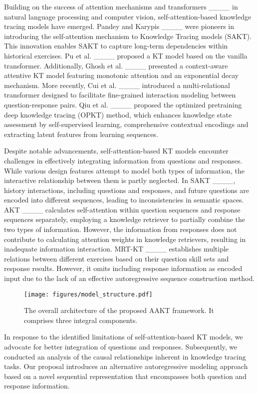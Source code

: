 Building on the success of attention mechanisms and transformers ____ in natural language processing and computer vision, self-attention-based knowledge tracing models have emerged. Pandey and Karypis ____ were pioneers in introducing the self-attention mechanism to Knowledge Tracing models (SAKT). This innovation enables SAKT to capture long-term dependencies within historical exercises. Pu et al. ____ proposed a KT model based on the vanilla transformer. Additionally, Ghosh et al. ____ presented a context-aware attentive KT model featuring monotonic attention and an exponential decay mechanism. More recently, Cui et al. ____ introduced a multi-relational transformer designed to facilitate fine-grained interaction modeling between question-response pairs. Qiu et al. ____ proposed the optimized pretraining deep knowledge tracing (OPKT) method, which enhances knowledge state assessment by self-supervised learning, comprehensive contextual encodings and extracting latent features from learning sequences.

{Despite notable advancements, self-attention-based KT models encounter challenges in effectively integrating information from questions and responses. While various design features attempt to model both types of information, the interactive relationship between them is partly neglected. In SAKT ____, history interactions, including questions and responses, and future questions are encoded into different sequences, leading to inconsistencies in semantic spaces. AKT ____ calculates self-attention within question sequences and response sequences separately, employing a knowledge retriever to partially combine the two types of information. However, the information from responses does not contribute to calculating attention weights in knowledge retrievers, resulting in inadequate information interaction. MRT-KT ____ establishes multiple relations between different exercises based on their question skill sets and response results. However, it omits including response information as encoded input due to the lack of an effective autoregressive sequence construction method.}

\begin{figure*}[ht]
\centering
\texttt{[image: figures/model\_structure.pdf]}
\caption{The overall architecture of the proposed AAKT framework. It comprises three integral components. }
\label{fig:model structure}
\end{figure*}

{In response to the identified limitations of self-attention-based KT models, we advocate for better integration of questions and responses. Subsequently, we conducted an analysis of the causal relationships inherent in knowledge tracing tasks. Our proposal introduces an alternative autoregressive modeling approach based on a novel sequential representation that encompasses both question and response information.}
